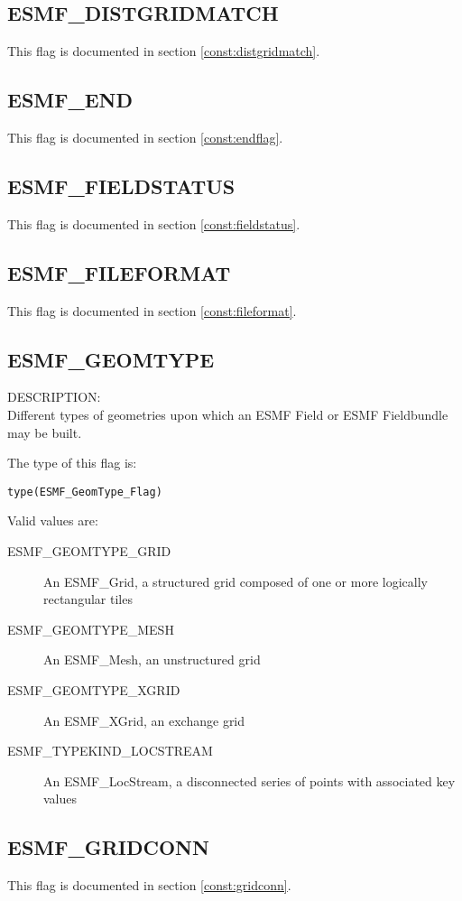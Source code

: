 \subsection{ESMF\_DISTGRIDMATCH}
This flag is documented in section \ref{const:distgridmatch}.

\subsection{ESMF\_END}

This flag is documented in section \ref{const:endflag}.

\subsection{ESMF\_FIELDSTATUS}
This flag is documented in section \ref{const:fieldstatus}.

\subsection{ESMF\_FILEFORMAT}
This flag is documented in section \ref{const:fileformat}.

\subsection{ESMF\_GEOMTYPE}
\label{const:geomtype}

{\sf DESCRIPTION:\\}
Different types of geometries upon which an ESMF Field or ESMF Fieldbundle may
be built. 

The type of this flag is:

{\tt type(ESMF\_GeomType\_Flag)}

Valid values are:
\begin{description}
\item [ESMF\_GEOMTYPE\_GRID]
      An ESMF\_Grid, a structured grid composed of one or more logically rectangular tiles
\item [ESMF\_GEOMTYPE\_MESH]
      An ESMF\_Mesh, an unstructured grid
\item [ESMF\_GEOMTYPE\_XGRID]
      An ESMF\_XGrid, an exchange grid
\item [ESMF\_TYPEKIND\_LOCSTREAM]
      An ESMF\_LocStream, a disconnected series of points with associated key values
\end{description}

\subsection{ESMF\_GRIDCONN}
This flag is documented in section \ref{const:gridconn}.

